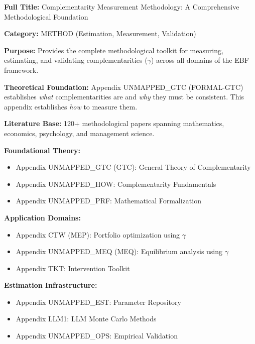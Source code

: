 \begin{tcolorbox}[colback=orange!5!white,colframe=orange!75!black,title=\textbf{Appendix UNMAPPED_CMP: METHOD-COMP}]
\textbf{Full Title:} Complementarity Measurement Methodology: A Comprehensive Methodological Foundation

\textbf{Category:} METHOD (Estimation, Measurement, Validation)

\textbf{Purpose:} Provides the complete methodological toolkit for measuring, estimating, and validating complementarities ($\gamma$) across all domains of the EBF framework.

\textbf{Theoretical Foundation:} Appendix UNMAPPED_GTC (FORMAL-GTC) establishes \textit{what} complementarities are and \textit{why} they must be consistent. This appendix establishes \textit{how} to measure them.

\textbf{Literature Base:} 120+ methodological papers spanning mathematics, economics, psychology, and management science.
\end{tcolorbox}

\begin{tcolorbox}[colback=gray!5!white,colframe=gray!75!black,title=\textbf{Cross-Reference Map}]
\small
\textbf{Foundational Theory:}
\begin{itemize}[noitemsep]
    \item Appendix UNMAPPED_GTC (GTC): General Theory of Complementarity
    \item Appendix UNMAPPED_HOW: Complementarity Fundamentals
    \item Appendix UNMAPPED_PRF: Mathematical Formalization
\end{itemize}

\textbf{Application Domains:}
\begin{itemize}[noitemsep]
    \item Appendix CTW (MEP): Portfolio optimization using $\gamma$
    \item Appendix UNMAPPED_MEQ (MEQ): Equilibrium analysis using $\gamma$
    \item Appendix TKT: Intervention Toolkit
\end{itemize}

\textbf{Estimation Infrastructure:}
\begin{itemize}[noitemsep]
    \item Appendix UNMAPPED_EST: Parameter Repository
    \item Appendix LLM1: LLM Monte Carlo Methods
    \item Appendix UNMAPPED_OPS: Empirical Validation
\end{itemize}
\end{tcolorbox}

